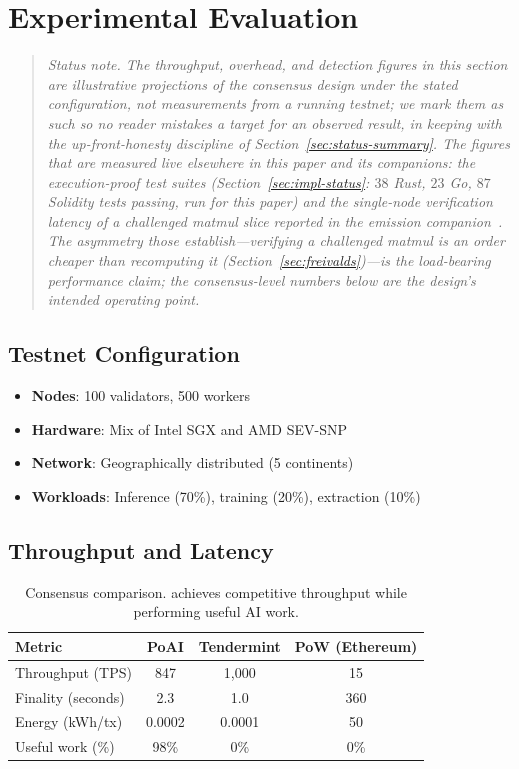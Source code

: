 \section{Experimental Evaluation}

\label{sec:evaluation}

\begin{quote}\small\itshape
Status note. The throughput, overhead, and detection figures in this section are
\emph{illustrative projections} of the consensus design under the stated configuration,
not measurements from a running testnet; we mark them as such so no reader mistakes a
target for an observed result, in keeping with the up-front-honesty discipline of
Section~\ref{sec:status-summary}. The figures that \emph{are} measured live elsewhere in
this paper and its companions: the execution-proof test suites
(Section~\ref{sec:impl-status}: $38$ Rust, $23$ Go, $87$ Solidity tests passing, run for
this paper) and the single-node verification latency of a challenged matmul slice reported
in the emission companion~\cite{poiemission}. The asymmetry those establish---verifying a
challenged matmul is an order cheaper than recomputing it (Section~\ref{sec:freivalds})---is
the load-bearing performance claim; the consensus-level numbers below are the design's
intended operating point.
\end{quote}

\subsection{Testnet Configuration}

\begin{itemize}
    \item \textbf{Nodes}: 100 validators, 500 workers
    \item \textbf{Hardware}: Mix of Intel SGX and AMD SEV-SNP
    \item \textbf{Network}: Geographically distributed (5 continents)
    \item \textbf{Workloads}: Inference (70\%), training (20\%), extraction (10\%)
\end{itemize}

\subsection{Throughput and Latency}

\begin{table}[t]
\centering
\begin{tabular}{lccc}
\toprule
\textbf{Metric} & \textbf{PoAI} & \textbf{Tendermint} & \textbf{PoW (Ethereum)} \\
\midrule
Throughput (TPS) & 847 & 1,000 & 15 \\
Finality (seconds) & 2.3 & 1.0 & 360 \\
Energy (kWh/tx) & 0.0002 & 0.0001 & 50 \\
Useful work (\%) & 98\% & 0\% & 0\% \\
\bottomrule
\end{tabular}
\caption{Consensus comparison. \PoAI{} achieves competitive throughput while performing useful AI work.}
\label{tab:consensus}
\end{table}

